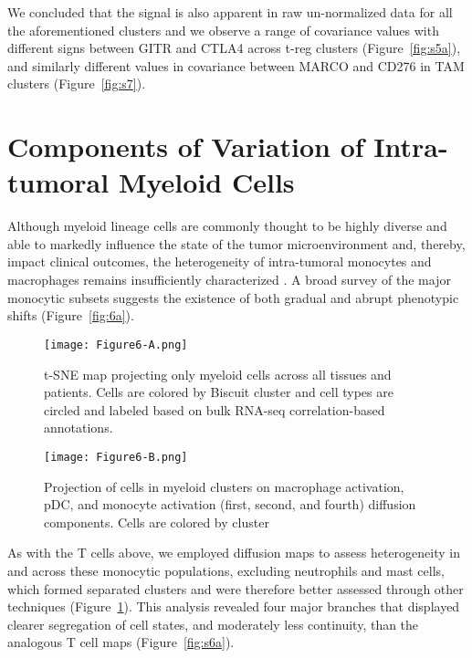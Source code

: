 We concluded that the signal is also apparent in raw un-normalized data for all the aforementioned clusters and we observe a range of covariance values with different signs between GITR and CTLA4 across t-reg clusters (Figure~\ref{fig:s5a}), and similarly different values in covariance between MARCO and CD276 in TAM clusters (Figure~\ref{fig:s7}).

\section{Components of Variation of Intra-tumoral Myeloid Cells}

Although myeloid lineage cells are commonly thought to be highly diverse and able to markedly influence the state of the tumor microenvironment and, thereby, impact clinical outcomes, the heterogeneity of intra-tumoral monocytes and macrophages remains insufficiently characterized \citep{Campbell2011,DeHenau2016,Engblom2016,Eppert2011,Gholamin2017,Pyonteck2013}.
A broad survey of the major monocytic subsets suggests the existence of both gradual and abrupt phenotypic shifts (Figure~\ref{fig:6a}).

\begin{figure}
\begin{minipage}{.5\textwidth}
  \centering
  \texttt{[image: Figure6-A.png]}
  \caption{t-SNE map projecting only myeloid cells across all tissues and patients. Cells are colored by Biscuit cluster and cell types are circled and labeled based on bulk RNA-seq correlation-based annotations.}
  \label{fig:6a}
\end{minipage}
\begin{minipage}{.5\textwidth}
  \centering
  \texttt{[image: Figure6-B.png]}
  \caption{Projection of cells in myeloid clusters on macrophage activation, pDC, and monocyte activation (first, second, and fourth) diffusion components. Cells are colored by cluster}
  \label{fig:6b}
\end{minipage}
\end{figure}

As with the T cells above, we employed diffusion maps to assess heterogeneity in and across these monocytic populations, excluding neutrophils and mast cells, which formed separated clusters and were therefore better assessed through other techniques (Figure~\ref{fig:6b}).
This analysis revealed four major branches that displayed clearer segregation of cell states, and moderately less continuity, than the analogous T cell maps (Figure~\ref{fig:s6a}).

